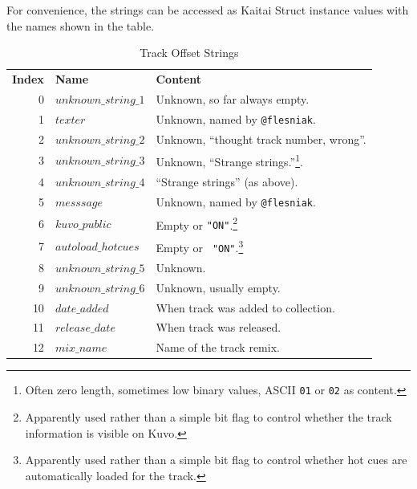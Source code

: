 \documentclass[11pt]{article}
\begin{document}
For convenience, the strings can be accessed as Kaitai Struct instance
values with the names shown in the table.

\begin{longtabu}{rlX}

  \toprule
  {\bfseries Index} & {\bfseries Name} & {\bfseries Content} \endhead

  \bottomrule \\
  \caption{Track Offset Strings} \endfoot

  0 & $unknown\_string\_1$ \label{table:trackStrings} & Unknown, so far always empty. \\

  1 & $texter$ & Unknown, named by {\tt @flesniak}. \\

  2 & $unknown\_string\_2$ & Unknown, ``thought track number, wrong''. \\

  3 & $unknown\_string\_3$ & Unknown, ``Strange
  strings.''\footnote{Often zero length, sometimes low binary values,
    ASCII {\tt 01} or {\tt 02} as content.}. \\

  4 & $unknown\_string\_4$ & ``Strange strings'' (as above). \\

  5 & $messsage$ & Unknown, named by {\tt @flesniak}. \\

  6 & $kuvo\_public$ & Empty or {\tt "ON"}.\footnote{Apparently
    used rather than a simple bit flag to control whether the track
    information is visible on Kuvo.} \\

  7 & $autoload\_hotcues$ & Empty or {\tt
    "ON"}.\footnote{Apparently used rather than a simple bit flag to
    control whether hot cues are automatically loaded for the track.}
  \\

  8 & $unknown\_string\_5$ & Unknown. \\

  9 & $unknown\_string\_6$ & Unknown, usually empty. \\

  10 & $date\_added$ & When track was added to collection. \\

  11 & $release\_date$ & When track was released. \\

  12 & $mix\_name$ & Name of the track remix. \\


\end{longtabu}
\end{document}
